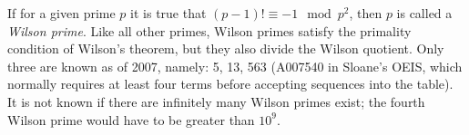 \documentclass[12pt]{article}
\begin{document}
If for a given prime $p$ it is true that $(p - 1)! \equiv -1 \mod p^2$, then $p$ is called a {\em Wilson prime}. Like all other primes, Wilson primes satisfy the primality condition of Wilson's theorem, but they also divide the Wilson quotient. Only three are known as of 2007, namely: 5, 13, 563 (A007540 in Sloane's OEIS, which normally requires at least four terms before accepting sequences into the table). It is not known if there are infinitely many Wilson primes exist; the fourth Wilson prime would have to be greater than $10^9$.
\end{document}
